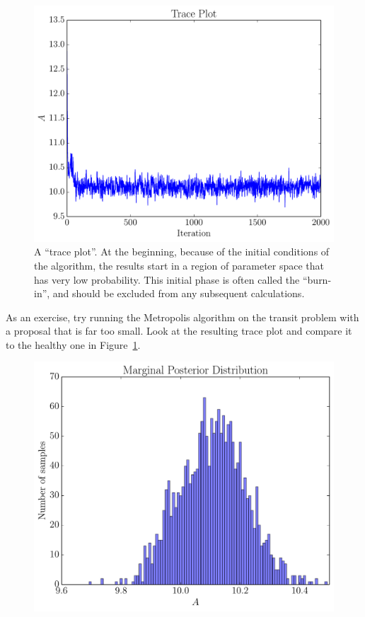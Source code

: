 \begin{figure}
\begin{center}
\includegraphics[scale=0.5]{trace_plot.pdf}
\caption{A ``trace plot''. At the beginning, because of the initial conditions
of the algorithm, the results start in a region of parameter space that has
very low probability. This initial phase is often called the ``burn-in'', and
should be excluded from any subsequent calculations.\label{fig:trace_plot}}
\end{center}
\end{figure}

As an exercise, try running the Metropolis algorithm on the transit problem
with a proposal that is far too small. Look at the resulting trace plot and
compare it to the healthy one in Figure~\ref{fig:trace_plot}.

\begin{figure}
\begin{center}
\includegraphics[scale=0.5]{marginal_posterior.pdf}
\caption{\label{fig:marginal_posterior}}
\end{center}
\end{figure}

